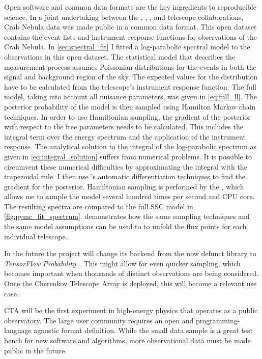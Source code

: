 Open software and common data formats are the key ingredients to reproducible science.
In a joint undertaking between the \fact, \magic, \veritas, and \hess telescope collaborations, Crab Nebula data was made public in 
a common data format. This open dataset contains the event lists and instrument response functions for observations of the Crab Nebula. 
In \cref{sec:spectral_fit} I fitted a log-parabolic spectral model to the observations in this open dataset. 
The statistical model that describes the measurement process
assumes Poissonian distributions for the events in both the signal and background region of the sky. 
The expected values for the distribution have to be calculated from the telescope's instrument response function.
The full model, taking into account all nuisance parameters, was given in \cref{eq:full_ll}. 
The posterior probability of the model is then sampled using Hamilton Markov chain techniques. 
In order to use Hamiltonian sampling, the gradient of the posterior with respect to the free parameters 
needs to be calculated. 
This includes the integral term over the energy spectrum and the application of the instrument response.
The analytical solution to the integral of the log-parabolic spectrum as given in \cref{eq:integral_solution}
suffers from numerical problems.
It is possible to circumvent these numerical difficulties by approximating the integral with the trapezoidal 
rule. I then use \theano's automatic differentiation techniques to find the gradient for the posterior. 
Hamiltonian sampling is performed by the \pymc, which allows me to sample the model several hundred times per second and 
CPU core.
The resulting spectra are compared to the full SSC model in \cref{fig:pymc_fit_spectrum}. 
 demonstrates how the same sampling techniques and the same model assumptions can be used to 
to unfold the flux points for each individual telescope. 

In the future the \pymc project will change its backend from the now defunct \theano library to \emph{TensorFlow Probability}~\cite{tensorflow-prob}.
This might allow for even quicker sampling, which becomes important when thousands of distinct observations are being considered.
Once the Cherenkov Telescope Array is deployed, this will become a relevant use case.

CTA will be the first experiment in 
high-energy physics that operates as a public observatory. The large user community requires an open and programming-language agnostic 
format definition. 
While the small data sample is a great test bench for new software and algorithms, 
more observational data must be made public in the future.

